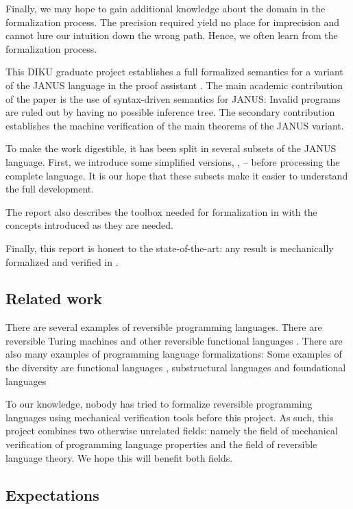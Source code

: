 Finally, we may hope to gain additional knowledge about the domain in
the formalization process. The precision required yield no place for
imprecision and cannot lure our intuition down the wrong path. Hence,
we often learn from the formalization process.

This DIKU graduate project establishes a full formalized semantics for
a variant of the JANUS language in the proof assistant \coq{}. The
main academic contribution of the paper is the use of syntax-driven
semantics for JANUS: Invalid programs are ruled out by having no possible
inference tree. The secondary contribution establishes the machine
verification of the main theorems of the JANUS variant.

To make the work digestible, it has been split in several subsets of
the JANUS language. First, we introduce some simplified versions,
\janusz{}, \januso{} -- before processing the complete language. It is
our hope that these subsets make it easier to understand the full
development.

The report also describes the toolbox needed for formalization in
\coq{} with the concepts introduced as they are needed.

Finally, this report is honest to the state-of-the-art: any result is
mechanically formalized and verified in \coq{}.

\subsection{Related work}

There are several examples of reversible programming languages. There
are reversible Turing machines \cite{morita+2007:reversible-tm} and
other reversible functional languages
\cite{glueck+2005:program-inverter}. There are also many examples of
programming language formalizations: Some examples of the diversity
are functional languages \cite{leroy+2009:coinductive-big-step},
substructural languages \cite{fluett+2007:phd-thesis} and foundational
languages \cite{jlouis+2007:bachelor}

To our knowledge, nobody has tried to formalize reversible programming
languages using mechanical verification tools before this project. As
such, this project combines two otherwise unrelated fields: namely the
field of mechanical verification of programming language properties
and the field of reversible language theory. We hope this will benefit
both fields.

\subsection{Expectations}

